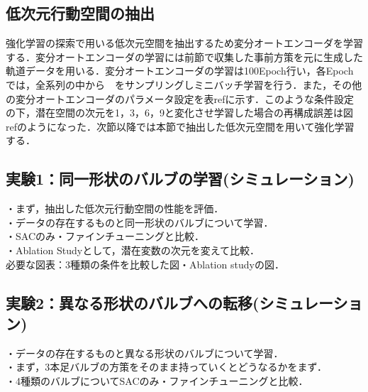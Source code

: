 \documentclass[dvipdfmx]{ampbt_nomag}
\begin{document}
\subsection{低次元行動空間の抽出}
強化学習の探索で用いる低次元空間を抽出するため変分オートエンコーダを学習する．変分オートエンコーダの学習には前節で収集した事前方策を元に生成した軌道データを用いる．変分オートエンコーダの学習は100Epoch行い，各Epochでは，全系列の中から　をサンプリングしミニバッチ学習を行う．また，その他の変分オートエンコーダのパラメータ設定を表ref{}に示す．このような条件設定の下，潜在空間の次元を1，3，6，9と変化させ学習した場合の再構成誤差は図ref{}のようになった．次節以降では本節で抽出した低次元空間を用いて強化学習する．



\subsection{実験1：同一形状のバルブの学習(シミュレーション)}
・まず，抽出した低次元行動空間の性能を評価．\\
・データの存在するものと同一形状のバルブについて学習．\\
・SACのみ・ファインチューニングと比較．\\
・Ablation Studyとして，潜在変数の次元を変えて比較．\\
必要な図表：3種類の条件を比較した図・Ablation studyの図．\\

\subsection{実験2：異なる形状のバルブへの転移(シミュレーション)}
・データの存在するものと異なる形状のバルブについて学習．\\
・まず，3本足バルブの方策をそのまま持っていくとどうなるかをまず．\\
・4種類のバルブについてSACのみ・ファインチューニングと比較．\\
\end{document}
